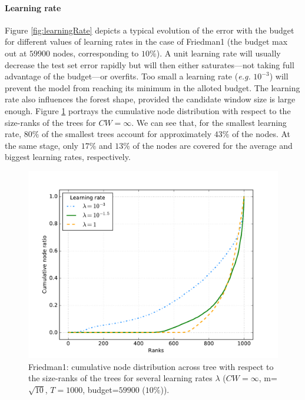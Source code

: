 \documentclass{article}
\begin{document}
\paragraph{Learning rate}
Figure \ref{fig:learningRate} depicts a typical evolution of the error with the 
budget for different values of learning rates in the case of Friedman1 (the 
budget max out at $59900$ nodes, corresponding to $10\%$). A unit learning rate 
will usually decrease the test set error rapidly but will then either 
saturates---not taking full advantage of the budget---or overfits. 
Too small a learning rate ({\it e.g.} $10^{-3}$) will prevent the model from 
reaching its minimum in the alloted budget.  The learning rate also influences 
the forest shape, provided the candidate window size is large enough. 
Figure \ref{fig:LRShape} portrays the cumulative node distribution with respect 
to the size-ranks of the trees for $CW=\infty$. We can see that, for the 
smallest learning rate,  $80\%$ of the smallest trees account for approximately 
$43\%$ of the nodes. At the same stage, only $17\%$ and $13\%$ of the nodes are 
covered for the average and biggest learning rates, respectively. 


\begin{figure}[ht]
\begin{center}
\centerline{\includegraphics[width=\columnwidth]{friedman1_cumul}}
\caption{Friedman1: cumulative node distribution across tree with respect to 
the size-ranks of the trees for several learning rates $\lambda$ ($CW=\infty$, 
m=$\sqrt{10}$, $T=1000$, budget=$59900$ ($10\%$)).}
\label{fig:LRShape}
\end{center}
\vskip -0.2in
\end{figure} 
\end{document}
